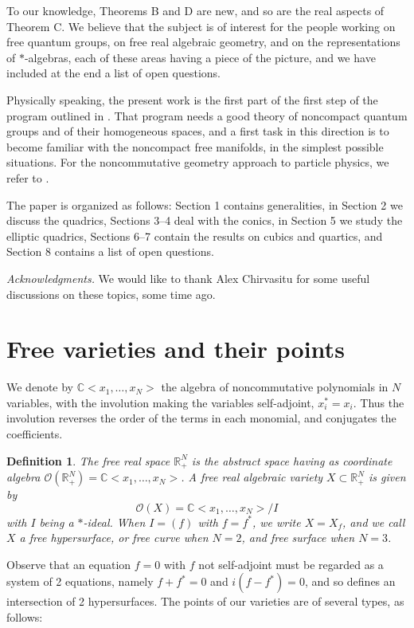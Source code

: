 \documentclass[11pt]{amsart}
\newtheorem{definition}[theorem]{Definition}
\theoremstyle{definition}
\begin{document}
To our knowledge, Theorems B and D are new, and so are the real aspects of Theorem C. We believe that the subject is of interest for the people working on free quantum groups, on free real algebraic geometry, and on the representations of $*$-algebras, each of these areas having a piece of the picture, and we have included at the end a list of open questions.

Physically speaking, the present work is the first part of the first step of the program outlined in \cite{bop}. That program needs a good theory of noncompact quantum groups and of their homogeneous spaces, and a first task in this direction is to become familiar with the noncompact free manifolds, in the simplest possible situations. For the noncommutative geometry approach to particle physics, we refer to \cite{cma}.

The paper is organized as follows: Section 1 contains generalities, in Section 2 we discuss the quadrics, Sections 3--4 deal with the conics, in Section 5 we study the elliptic quadrics, Sections 6--7 contain the results on cubics and quartics, and Section 8 contains a list of open questions.

\medskip

{\em Acknowledgments.} We would like to thank Alex Chirvasitu for some useful discussions on these topics, some time ago.

\section{Free varieties and their points}

We denote by $\mathbb C<x_1,\ldots,x_N>$ the algebra of noncommutative polynomials in $N$ variables, with the involution making the variables self-adjoint, $x_i^*=x_i$. Thus the involution reverses the order of the terms in each monomial, and conjugates the coefficients.

\begin{definition}
The free real space $\mathbb R^N_+$ is the abstract space having as coordinate algebra $\mathcal O(\mathbb R^N_+)=\mathbb C<x_1,\ldots,x_N>$. A free real algebraic variety $X\subset\mathbb R^N_+$ is given by
$$\mathcal O(X)=\mathbb C<x_1,\ldots,x_N>/I$$
with $I$ being a $*$-ideal. When $I=(f)$ with $f=f^*$, we write $X=X_f$, and we call $X$ a free hypersurface, or free curve when $N=2$, and free surface when $N=3$.
\end{definition}

Observe that an equation $f=0$ with $f$ not self-adjoint must be regarded as a system of 2 equations, namely $f+f^*=0$ and $i(f-f^*)=0$, and so defines an intersection of 2 hypersurfaces. The points of our varieties are of several types, as follows:
\end{document}
